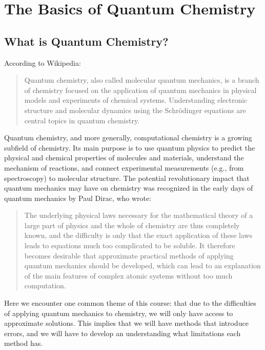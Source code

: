 \documentclass[../Main/chem371-notes.tex]{subfiles}
\begin{document}
\chapter{The Basics of Quantum Chemistry}

\section{What is Quantum Chemistry?}
According to Wikipedia:
\begin{quotation}
Quantum chemistry, also called molecular quantum mechanics, is a branch of chemistry focused on the application of quantum mechanics in physical models and experiments of chemical systems. Understanding electronic structure and molecular dynamics using the Schrödinger equations are central topics in quantum chemistry.
\end{quotation}

Quantum chemistry, and more generally, computational chemistry is a growing subfield of chemistry.
Its main purpose is to use quantum physics to predict the physical and chemical properties of molecules and materials, understand the mechanism of reactions, and connect experimental measurements (e.g., from spectroscopy) to molecular structure.
The potential revolutionary impact that quantum mechanics may have on chemistry was recognized in the early days of quantum mechanics by Paul Dirac, who wrote:
\begin{quotation}
The underlying physical laws necessary for the mathematical theory of a large part of physics and the whole of chemistry are thus completely known, and the difficulty is only that the exact application of these laws leads to equations much too complicated to be soluble.
It therefore becomes desirable that approximate practical methods of applying quantum mechanics should be developed, which can lead to an explanation of the main features of complex atomic systems without too much computation.
\end{quotation}

Here we encounter one common theme of this course: that due to the difficulties of applying quantum mechanics to chemistry, we will only have access to approximate solutions.
This implies that we will have methods that introduce errors, and we will have to develop an understanding what limitations each method has.
\end{document}
